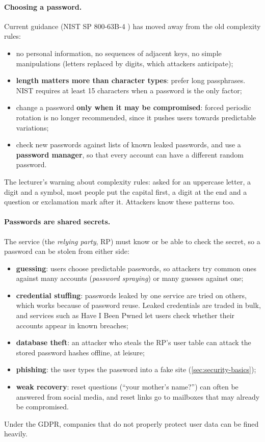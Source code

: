 \paragraph{Choosing a password.} Current guidance (NIST SP 800-63B-4 \cite{nist80063b4}) has moved away from the old complexity rules:
\begin{itemize}
    \item no personal information, no sequences of adjacent keys, no simple manipulations (letters replaced by digits, which attackers anticipate);
    \item \textbf{length matters more than character types}: prefer long passphrases. NIST requires at least 15 characters when a password is the only factor;
    \item change a password \textbf{only when it may be compromised}: forced periodic rotation is no longer recommended, since it pushes users towards predictable variations;
    \item check new passwords against lists of known leaked passwords, and use a \textbf{password manager}, so that every account can have a different random password.
\end{itemize}
The lecturer's warning about complexity rules: asked for an uppercase letter, a digit and a symbol, most people put the capital first, a digit at the end and a question or exclamation mark after it. Attackers know these patterns too.

\paragraph{Passwords are shared secrets.} The service (the \emph{relying party}, RP) must know or be able to check the secret, so a password can be stolen from either side:
\begin{itemize}
    \item \textbf{guessing}: users choose predictable passwords, so attackers try common ones against many accounts (\emph{password spraying}) or many guesses against one;
    \item \textbf{credential stuffing}: passwords leaked by one service are tried on others, which works because of password reuse. Leaked credentials are traded in bulk, and services such as Have I Been Pwned let users check whether their accounts appear in known breaches;
    \item \textbf{database theft}: an attacker who steals the RP's user table can attack the stored password hashes offline, at leisure;
    \item \textbf{phishing}: the user types the password into a fake site (\cref{sec:security-basics});
    \item \textbf{weak recovery}: reset questions (\enquote{your mother's name?}) can often be answered from social media, and reset links go to mailboxes that may already be compromised.
\end{itemize}
Under the GDPR, companies that do not properly protect user data can be fined heavily.


